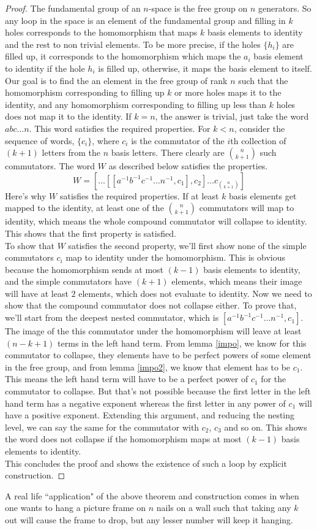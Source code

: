 \begin{proof}
The fundamental group of an $n$-space is the free group on $n$ generators. So any loop in the space is an element of the fundamental group and filling in $k$ holes corresponds to the homomorphism that maps $k$ basis elements to identity and the rest to non trivial elements. To be more precise, if the holes $\{h_i\}$ are filled up, it corresponds to the homomorphism which maps the $a_i$ basis element to identity if the hole $h_i$ is filled up, otherwise, it maps the basis element to itself. Our goal is to find the an element in the free group of rank $n$ such that the homomorphism corresponding to filling up $k$ or more holes maps it to the identity, and any homomorphism corresponding to filling up less than $k$ holes does not map it to the identity.
If $k=n$, the answer is trivial, just take the word $abc\ldots n$. This word satisfies the required properties. For $k<n$, consider the sequence of words, $\{c_i\}$, where $c_i$ is the commutator of the $i$th collection of $(k+1)$ letters from the $n$ basis letters. There clearly are $n \choose {k+1}$ such commutators. The word $W$ as described below satisfies the properties.
$$W = \left[ \ldots [[a^{-1}b^{-1}c^{-1}\ldots n^{-1}, c_1], c_2] \ldots c_{n \choose{k+1}}\right]$$
Here's why $W$ satisfies the required properties. If at least $k$ basis elements get mapped to the identity, at least one of the $n \choose{k+1}$ commutators will map to identity, which means the whole compound commutator will collapse to identity. This shows that the first property is satisfied.\\
To show that $W$ satisfies the second property, we'll first show none of the simple commutators $c_i$ map to identity under the homomorphism. This is obvious because the homomorphism sends at most $(k-1)$ basis elements to identity, and the simple commutators have $(k+1)$ elements, which means their image will have at least $2$ elements, which does not evaluate to identity. Now we need to show that the compound commutator does not collapse either. To prove that, we'll start from the deepest nested commutator, which is $[a^{-1}b^{-1}c^{-1}\ldots n^{-1}, c_1]$. The image of the this commutator under the homomorphism will leave at least $(n-k+1)$ terms in the left hand term. From lemma \autoref{impo}, we know for this commutator to collapse, they elements have to be perfect powers of some element in the free group, and from lemma \autoref{impo2}, we know that element has to be $c_1$. This means the left hand term will have to be a perfect power of $c_1$ for the commutator to collapse. But that's not possible because the first letter in the left hand term has a negative exponent whereas the first letter in any power of $c_1$ will have a positive exponent. Extending this argument, and reducing the nesting level, we can say the same for the commutator with $c_2$, $c_3$ and so on. This shows the word does not collapse if the homomorphism maps at most $(k-1)$ basis elements to identity.\\
This concludes the proof and shows the existence of such a loop by explicit construction.
\end{proof}

A real life ``application" of the above theorem and construction comes in when one wants to hang a picture frame on $n$ nails on a wall such that taking any $k$ out will cause the frame to drop, but any lesser number will keep it hanging.